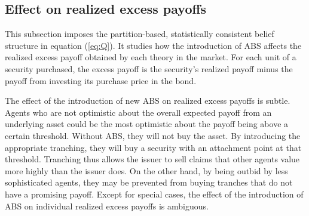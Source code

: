 \documentclass[11pt]{article}
\theoremstyle{plain}
\begin{document}
\subsection{Effect on realized excess payoffs} \label{sec:ep}

This subsection imposes the partition-based, statistically consistent belief structure in equation (\ref{eq:Q}). It studies how the introduction of ABS affects the realized excess payoff obtained by each theory in the market. For each unit of a security purchased, the excess payoff is the security's realized payoff minus the payoff from investing its purchase price in the bond.

The effect of the introduction of new ABS on realized excess payoffs is subtle. Agents who are not optimistic about the overall expected payoff from an underlying asset could be the most optimistic about the payoff being above a certain threshold. Without ABS, they will not buy the asset. By introducing the appropriate tranching, they will buy a security with an attachment point at that threshold. Tranching thus allows the issuer to sell claims that other agents value more highly than the issuer does. On the other hand, by being outbid by less sophisticated agents, they may be prevented from buying tranches that do not have a promising payoff. Except for special cases, the effect of the introduction of ABS on individual realized excess payoffs is ambiguous.
\end{document}
